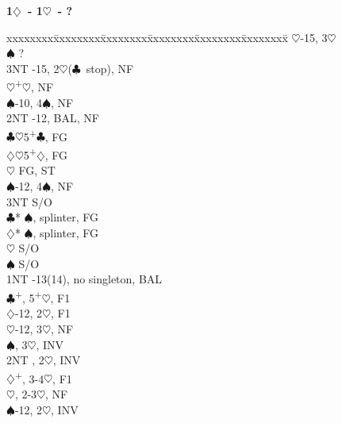\documentclass[10pt]{article}
\renewcommand{\c}{$\clubsuit$}
\renewcommand{\d}{$\diamondsuit$}
\newcommand{\h}{$\heartsuit$}
\newcommand{\s}{$\spadesuit$}
\newcommand{\p}{\textsuperscript{+}}
\newenvironment{bidtable}[1][]
{\textbf{#1}
  \begin{adjustwidth}{1em}{}
    \addvspace{2pt}
    \begin{tabbing}
      xxxxxxxx\=xxxxxxxx\=xxxxxxxx\=xxxxxxxx\=xxxxxxxx\=xxxxxxxx\=\kill}
{\end{tabbing}\end{adjustwidth}\bigskip}%
\begin{document}
\begin{multicols*}{2}
\begin{bidtable}[1\d\ - 1\h\ - ?]
                \>      \h      {}-15, 3\h                  \\
                \>      \s      \> ?                           \\
                \>      \> 3NT      -15, 2\h (\c\ stop), NF   \\
                \h  {}\p\h, NF                               \\
                \s  {}-10, 4\s, NF                           \\
                \> 2NT  -12, BAL, NF                          \\
                \c  {}\h 5\p\c, FG                           \\
                \d  {}\h 5\p\d, FG                           \\
                \h  \> FG, ST                                  \\
                \s  {}-12, 4\s, NF                          \\
                \> 3NT  \> S/O                                     \\
                \c* {}\s, splinter, FG                       \\
                \d* {}\s, splinter, FG                       \\
                \h  \> S/O                                     \\
                \s  \> S/O                                     \\
1NT             -13(14), no singleton, BAL                    \\
                \c  {}\p, 5\p\h, F1                          \\
                \>      \d      {}-12, 2\h, F1              \\
                \>      \h      {}-12, 3\h, NF              \\
                \>      \s      {}, 3\h, INV                \\
                \>      \> 2NT      , 2\h, INV                \\
                \d  {}\p, 3-4\h, F1                          \\
                \>      \h      {}, 2-3\h, NF               \\
                \>      \s      {}-12, 2\h, INV             \\

\end{bidtable}
\end{multicols*}
\end{document}
